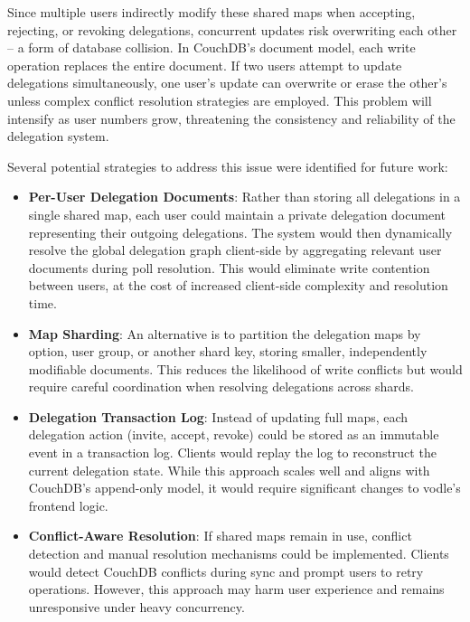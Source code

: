 Since multiple users indirectly modify these shared maps when accepting, rejecting, or revoking delegations, concurrent updates risk overwriting each other -- a form of database collision. In CouchDB's document model, each write operation replaces the entire document. If two users attempt to update delegations simultaneously, one user's update can overwrite or erase the other's unless complex conflict resolution strategies are employed. This problem will intensify as user numbers grow, threatening the consistency and reliability of the delegation system.

Several potential strategies to address this issue were identified for future work:

\begin{itemize} \item \textbf{Per-User Delegation Documents}: Rather than storing all delegations in a single shared map, each user could maintain a private delegation document representing their outgoing delegations. The system would then dynamically resolve the global delegation graph client-side by aggregating relevant user documents during poll resolution. This would eliminate write contention between users, at the cost of increased client-side complexity and resolution time.

\item \textbf{Map Sharding}: An alternative is to partition the delegation maps by option, user group, or another shard key, storing smaller, independently modifiable documents. This reduces the likelihood of write conflicts but would require careful coordination when resolving delegations across shards.

\item \textbf{Delegation Transaction Log}: Instead of updating full maps, each delegation action (invite, accept, revoke) could be stored as an immutable event in a transaction log. Clients would replay the log to reconstruct the current delegation state. While this approach scales well and aligns with CouchDB's append-only model, it would require significant changes to vodle's frontend logic.

\item \textbf{Conflict-Aware Resolution}: If shared maps remain in use, conflict detection and manual resolution mechanisms could be implemented. Clients would detect CouchDB conflicts during sync and prompt users to retry operations. However, this approach may harm user experience and remains unresponsive under heavy concurrency.
\end{itemize}

